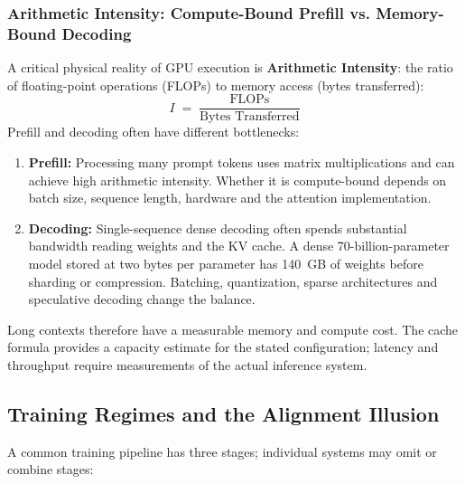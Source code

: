 \documentclass[11pt,a4paper]{article}
\begin{document}
\subsubsection{Arithmetic Intensity: Compute-Bound Prefill vs. Memory-Bound Decoding}
A critical physical reality of GPU execution is \textbf{Arithmetic Intensity}: the ratio of floating-point operations (FLOPs) to memory access (bytes transferred):
\begin{equation}
I \;=\; \frac{\text{FLOPs}}{\text{Bytes Transferred}}
\end{equation}
Prefill and decoding often have different bottlenecks:
\begin{enumerate}[leftmargin=1.8em,itemsep=2pt]
  \item \textbf{Prefill:} Processing many prompt tokens uses matrix multiplications and can achieve high arithmetic intensity. Whether it is compute-bound depends on batch size, sequence length, hardware and the attention implementation.
  \item \textbf{Decoding:} Single-sequence dense decoding often spends substantial bandwidth reading weights and the KV cache. A dense 70-billion-parameter model stored at two bytes per parameter has 140~GB of weights before sharding or compression. Batching, quantization, sparse architectures and speculative decoding change the balance.
\end{enumerate}
Long contexts therefore have a measurable memory and compute cost. The cache formula provides a capacity estimate for the stated configuration; latency and throughput require measurements of the actual inference system.

\subsection{Training Regimes and the Alignment Illusion}

A common training pipeline has three stages; individual systems may omit or combine stages:
\end{document}
